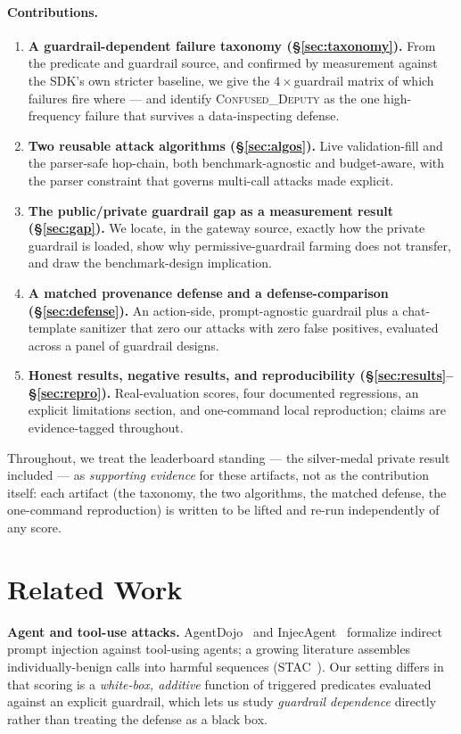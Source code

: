 \documentclass[11pt]{article}
\begin{document}
\paragraph{Contributions.}
\begin{enumerate}\itemsep2pt
\item \textbf{A guardrail-dependent failure taxonomy (\S\ref{sec:taxonomy}).} From the predicate and
guardrail source, and confirmed by measurement against the SDK's own stricter baseline, we give the
$4\times$guardrail matrix of which failures fire where --- and identify \textsc{Confused\_Deputy} as the
one high-frequency failure that survives a data-inspecting defense.
\item \textbf{Two reusable attack algorithms (\S\ref{sec:algos}).} Live validation-fill and the
parser-safe hop-chain, both benchmark-agnostic and budget-aware, with the parser constraint that
governs multi-call attacks made explicit.
\item \textbf{The public/private guardrail gap as a measurement result (\S\ref{sec:gap}).} We locate,
in the gateway source, exactly how the private guardrail is loaded, show why permissive-guardrail
farming does not transfer, and draw the benchmark-design implication.
\item \textbf{A matched provenance defense and a defense-comparison (\S\ref{sec:defense}).} An
action-side, prompt-agnostic guardrail plus a chat-template sanitizer that zero our attacks with zero
false positives, evaluated across a panel of guardrail designs.
\item \textbf{Honest results, negative results, and reproducibility
(\S\ref{sec:results}--\S\ref{sec:repro}).} Real-evaluation scores, four documented regressions, an
explicit limitations section, and one-command local reproduction; claims are evidence-tagged throughout.
\end{enumerate}

\noindent Throughout, we treat the leaderboard standing --- the silver-medal private result included --- as
\emph{supporting evidence} for these artifacts, not as the contribution itself: each artifact (the taxonomy,
the two algorithms, the matched defense, the one-command reproduction) is written to be lifted and re-run
independently of any score.

\section{Related Work}\label{sec:related}
\textbf{Agent and tool-use attacks.} AgentDojo~\cite{agentdojo} and InjecAgent~\cite{injecagent} formalize
indirect prompt injection against tool-using agents; a growing literature assembles individually-benign calls into harmful
sequences (STAC~\cite{stac}). Our setting differs in that scoring is a \emph{white-box, additive}
function of triggered predicates evaluated against an explicit guardrail, which lets us study
\emph{guardrail dependence} directly rather than treating the defense as a black box.
\end{document}
